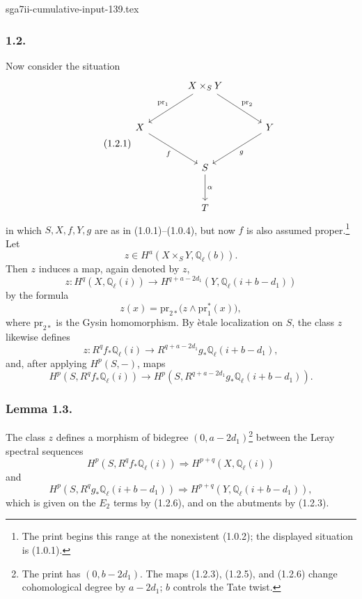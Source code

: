 \begin{filecontents*}{sga7ii-cumulative-input-139.tex}
\subsubsection*{1.2.}
Now consider the situation
\begin{equation}\tag{1.2.1}
\begin{tikzcd}[column sep=large, row sep=large]
{} & X\times_S Y \arrow[dl, "\mathrm{pr}_1"']
                  \arrow[dr, "\mathrm{pr}_2"] & {} \\
X \arrow[dr, "f"'] & {} & Y \arrow[dl, "g"] \\
{} & S \arrow[d, "\alpha"] & {} \\
{} & T & {}
\end{tikzcd}
\end{equation}
in which $S,X,f,Y,g$ are as in (1.0.1)--(1.0.4), but now $f$ is also
assumed proper.\footnote{The print begins this range at the nonexistent
(1.0.2); the displayed situation is (1.0.1).}  Let
\begin{equation}\tag{1.2.2}
z\in H^a(X\times_S Y,\mathbb Q_\ell(b)).
\end{equation}
Then $z$ induces a map, again denoted by $z$,
\begin{equation}\tag{1.2.3}
z:H^q(X,\mathbb Q_\ell(i))\longrightarrow
H^{q+a-2d_1}(Y,\mathbb Q_\ell(i+b-d_1))
\end{equation}
by the formula
\begin{equation}\tag{1.2.4}
z(x)=\mathrm{pr}_{2*}\bigl(z\wedge\mathrm{pr}_1^*(x)\bigr),
\end{equation}
where $\mathrm{pr}_{2*}$ is the Gysin homomorphism.  By \`etale localization
on $S$, the class $z$ likewise defines
\begin{equation}\tag{1.2.5}
z:R^qf_*\mathbb Q_\ell(i)\longrightarrow
R^{q+a-2d_1}g_*\mathbb Q_\ell(i+b-d_1),
\end{equation}
and, after applying $H^p(S,-)$, maps
\begin{equation}\tag{1.2.6}
H^p(S,R^qf_*\mathbb Q_\ell(i))\longrightarrow
H^p(S,R^{q+a-2d_1}g_*\mathbb Q_\ell(i+b-d_1)).
\end{equation}

\subsubsection*{Lemma 1.3.}
The class $z$ defines a morphism of bidegree
$(0,a-2d_1)$\footnote{The print has $(0,b-2d_1)$.  The maps (1.2.3),
(1.2.5), and (1.2.6) change cohomological degree by $a-2d_1$; $b$ controls
the Tate twist.} between the Leray spectral sequences
\begin{equation}\tag{1.2.7}
H^p(S,R^qf_*\mathbb Q_\ell(i))\Longrightarrow
H^{p+q}(X,\mathbb Q_\ell(i))
\end{equation}
and
\begin{equation}\tag{1.2.8}
H^p(S,R^qg_*\mathbb Q_\ell(i+b-d_1))\Longrightarrow
H^{p+q}(Y,\mathbb Q_\ell(i+b-d_1)),
\end{equation}
which is given on the $E_2$ terms by (1.2.6), and on the abutments by
(1.2.3).


\end{filecontents*}
